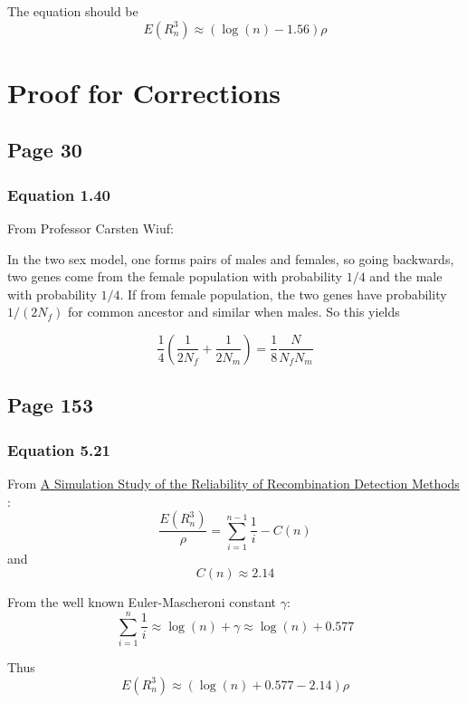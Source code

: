 The equation should be
\[
E(R_n^3) \approx \left( \log(n) - 1.56 \right) \rho
\]


\section{Proof for Corrections}

\subsection{Page 30}

\subsubsection{Equation 1.40}

From Professor Carsten Wiuf:

In the two sex model, one forms pairs of males and females, so going backwards,
two genes come from the female population with probability $1/4$ and the male
with probability $1/4$. If from female population, the two genes have
probability $1/(2N_f)$ for common ancestor and similar when males. So this
yields

\[
\frac{1}{4} \left( \frac{1}{2N_f} + \frac{1}{2N_m} \right) = \frac{1}{8} \frac{N}{N_f N_m}
\]

\subsection{Page 153}

\subsubsection{Equation 5.21}

From \href{https://doi.org/10.1093/oxfordjournals.molbev.a003733}{A
Simulation Study of the Reliability of Recombination Detection Methods}
\cite{wiuf_simulation_2001}:
\[
\frac{ E(R_n^3) }{\rho} = \sum_{i=1}^{n-1} \frac{1}{i} - C(n)
\]
and
\[
C(n) \approx 2.14
\]

From the well known Euler-Mascheroni constant $\gamma$:
\[
\sum_{i=1}^n \frac{1}{i} \approx \log(n) + \gamma \approx \log(n) + 0.577
\]

Thus
\[
E(R_n^3) \approx \left( \log(n) + 0.577 - 2.14 \right) \rho
\]


\printbibliography %

